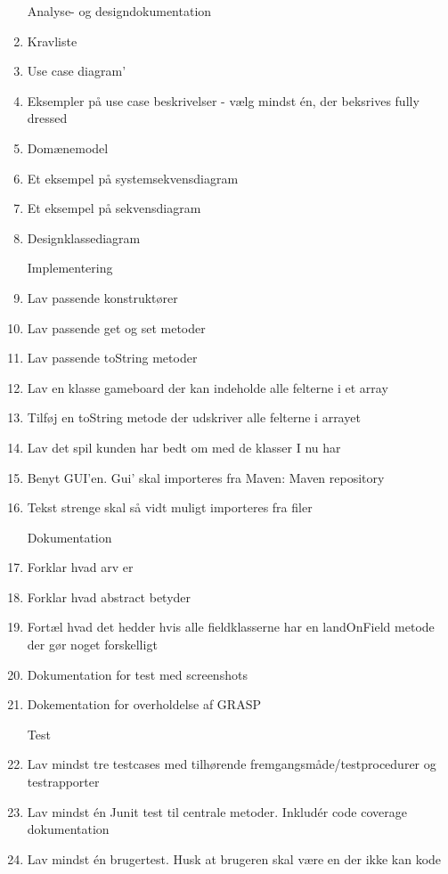 \documentclass[../main.tex]{subfiles}
\begin{document}
\begin{enumerate}
\hfill

{\Large Analyse- og designdokumentation}
   \item Kravliste
   \item Use case diagram'
   \item Eksempler på use case beskrivelser - vælg mindst én, der beksrives fully dressed
   \item Domænemodel
   \item Et eksempel på systemsekvensdiagram
   \item Et eksempel på sekvensdiagram
   \item Designklassediagram
   
   \hfill
   
{\Large Implementering}
    \item Lav passende konstruktører
    \item Lav passende get og set metoder
    \item Lav passende toString metoder
    \item Lav en klasse gameboard der kan indeholde alle felterne i et array
    \item Tilføj en toString metode der udskriver alle felterne i arrayet
    \item Lav det spil kunden har bedt om med de klasser I nu har
    \item Benyt GUI'en. Gui' skal importeres fra Maven: Maven repository
    \item Tekst strenge skal så vidt muligt importeres fra filer
    
    \hfill

{\Large Dokumentation}
    \item Forklar hvad arv er
    \item Forklar hvad abstract betyder
    \item Fortæl hvad det hedder hvis alle fieldklasserne har en landOnField metode der gør noget forskelligt
    \item Dokumentation for test med screenshots
    \item Dokementation for overholdelse af GRASP
    
    \hfill

{\Large Test}
    \item Lav mindst tre testcases med tilhørende fremgangsmåde/testprocedurer og testrapporter
    \item Lav mindst én Junit test til centrale metoder. Inkludér code coverage dokumentation
    \item Lav mindst én brugertest. Husk at brugeren skal være en der ikke kan kode
    

\end{enumerate}
\end{document}
